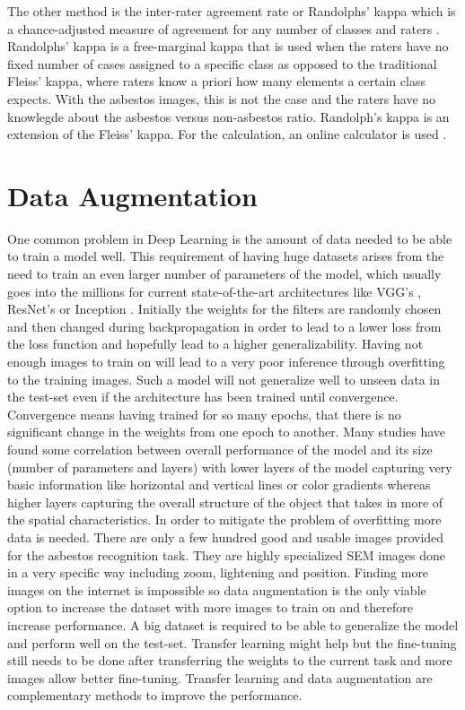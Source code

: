 The other method is the inter-rater agreement rate or Randolphs' kappa which is a chance-adjusted measure of agreement for any number of classes and raters \cite{randolph2005free}. Randolphs' kappa is a free-marginal kappa that is used when the raters have no fixed number of cases assigned to a specific class as opposed to the traditional Fleiss' kappa, where raters know a priori how many elements a certain class expects. With the asbestos images, this is not the case and the raters have no knowlegde about the asbestos versus non-asbestos ratio. Randolph's kappa is an extension of the Fleiss' kappa. For the calculation, an online calculator is used \cite{humanlevel2014}.

\section{Data Augmentation}

One common problem in Deep Learning is the amount of data needed to be able to train a model well. This requirement of having huge datasets arises from the need to train an even larger number of parameters of the model, which usually goes into the millions for current state-of-the-art architectures like VGG's \cite{simonyan2014very}, ResNet's \cite{he2016deep} or Inception \cite{szegedy2015going, szegedy2016rethinking}. Initially the weights for the filters are randomly chosen and then changed during backpropagation in order to lead to a lower loss from the loss function and hopefully lead to a higher generalizability. Having not enough images to train on will lead to a very poor inference through overfitting to the training images. Such a model will not generalize well to unseen data in the test-set even if the architecture has been trained until convergence. Convergence means having trained  for so many epochs, that there is no significant change in the weights from one epoch to another. Many studies have found some correlation between overall performance of the model and its size (number of parameters and layers) with lower layers of the model capturing very basic information like horizontal and vertical lines or color gradients whereas higher layers capturing the overall structure of the object that takes in more of the spatial characteristics. In order to mitigate the problem of overfitting more data is needed. There are only a few hundred good and usable images provided for the asbestos recognition task. They are highly specialized SEM images done in a very specific way including zoom, lightening and position. Finding more images on the internet is impossible so data augmentation is the only viable option to increase the dataset with more images to train on and therefore increase performance. A big dataset is required to be able to generalize the model and perform well on the test-set. Transfer learning might help but the fine-tuning still needs to be done after transferring the weights to the current task and more images allow better fine-tuning. Transfer learning and data augmentation are complementary methods to improve the performance.

